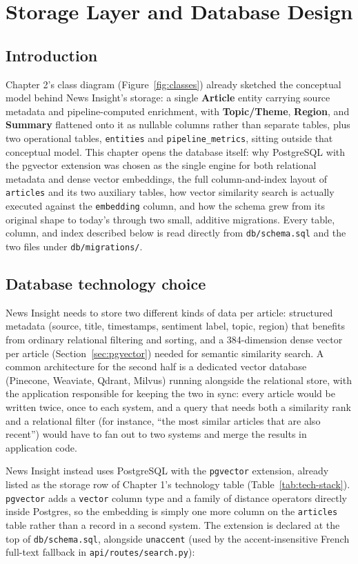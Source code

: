 \chapter{Storage Layer and Database Design}

\section{Introduction}
Chapter 2's class diagram (Figure~\ref{fig:classes}) already sketched the conceptual model behind News Insight's storage: a single \textbf{Article} entity carrying source metadata and pipeline-computed enrichment, with \textbf{Topic/Theme}, \textbf{Region}, and \textbf{Summary} flattened onto it as nullable columns rather than separate tables, plus two operational tables, \texttt{entities} and \texttt{pipeline\_metrics}, sitting outside that conceptual model. This chapter opens the database itself: why PostgreSQL with the pgvector extension was chosen as the single engine for both relational metadata and dense vector embeddings, the full column-and-index layout of \texttt{articles} and its two auxiliary tables, how vector similarity search is actually executed against the \texttt{embedding} column, and how the schema grew from its original shape to today's through two small, additive migrations. Every table, column, and index described below is read directly from \texttt{db/schema.sql} and the two files under \texttt{db/migrations/}.

\section{Database technology choice}
\label{sec:db-tech}
News Insight needs to store two different kinds of data per article: structured metadata (source, title, timestamps, sentiment label, topic, region) that benefits from ordinary relational filtering and sorting, and a 384-dimension dense vector per article (Section~\ref{sec:pgvector}) needed for semantic similarity search. A common architecture for the second half is a dedicated vector database (Pinecone, Weaviate, Qdrant, Milvus) running alongside the relational store, with the application responsible for keeping the two in sync: every article would be written twice, once to each system, and a query that needs both a similarity rank and a relational filter (for instance, ``the most similar articles that are also recent'') would have to fan out to two systems and merge the results in application code.

News Insight instead uses PostgreSQL with the \texttt{pgvector} extension, already listed as the storage row of Chapter 1's technology table (Table~\ref{tab:tech-stack}). \texttt{pgvector} adds a \texttt{vector} column type and a family of distance operators directly inside Postgres, so the embedding is simply one more column on the \texttt{articles} table rather than a record in a second system. The extension is declared at the top of \texttt{db/schema.sql}, alongside \texttt{unaccent} (used by the accent-insensitive French full-text fallback in \texttt{api/routes/search.py}):


